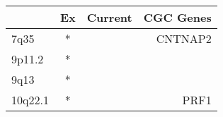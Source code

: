 \begin{tabular}{lccr}
\toprule
{} & Ex & Current & CGC Genes \\
\midrule
7q35    &  * &         &   CNTNAP2 \\
9p11.2  &  * &         &           \\
9q13    &  * &         &           \\
10q22.1 &  * &         &      PRF1 \\
\bottomrule
\end{tabular}
